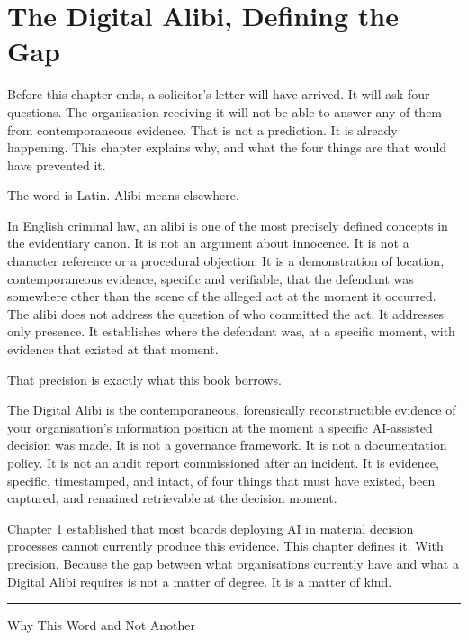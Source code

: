 
\chapter{The Digital Alibi, Defining the Gap}

Before this chapter ends, a solicitor's letter will have arrived. It will ask four questions. The organisation receiving it will not be able to answer any of them from contemporaneous evidence. That is not a prediction. It is already happening. This chapter explains why, and what the four things are that would have prevented it.

The word is Latin. Alibi means elsewhere.

In English criminal law, an alibi is one of the most precisely defined concepts in the evidentiary canon. It is not an argument about innocence. It is not a character reference or a procedural objection. It is a demonstration of location, contemporaneous evidence, specific and verifiable, that the defendant was somewhere other than the scene of the alleged act at the moment it occurred. The alibi does not address the question of who committed the act. It addresses only presence. It establishes where the defendant was, at a specific moment, with evidence that existed at that moment.

That precision is exactly what this book borrows.

The Digital Alibi is the contemporaneous, forensically reconstructible evidence of your organisation's information position at the moment a specific AI-assisted decision was made. It is not a governance framework. It is not a documentation policy. It is not an audit report commissioned after an incident. It is evidence, specific, timestamped, and intact, of four things that must have existed, been captured, and remained retrievable at the decision moment.

Chapter 1 established that most boards deploying AI in material decision processes cannot currently produce this evidence. This chapter defines it. With precision. Because the gap between what organisations currently have and what a Digital Alibi requires is not a matter of degree. It is a matter of kind.

\begin{center}\rule{0.5\linewidth}{0.5pt}\end{center}

Why This Word and Not Another

